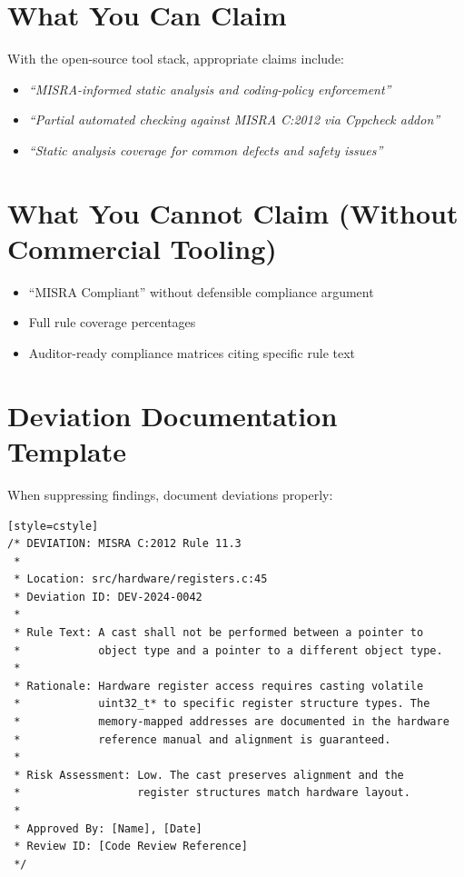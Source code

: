 \documentclass[11pt,letterpaper]{report}
\begin{document}
\section{What You Can Claim}

With the open-source tool stack, appropriate claims include:

\begin{itemize}[leftmargin=*]
    \item \textit{``MISRA-informed static analysis and coding-policy enforcement''}
    \item \textit{``Partial automated checking against MISRA C:2012 via Cppcheck addon''}
    \item \textit{``Static analysis coverage for common defects and safety issues''}
\end{itemize}

\section{What You Cannot Claim (Without Commercial Tooling)}

\begin{itemize}[leftmargin=*]
    \item ``MISRA Compliant'' without defensible compliance argument
    \item Full rule coverage percentages
    \item Auditor-ready compliance matrices citing specific rule text
\end{itemize}

\section{Deviation Documentation Template}

When suppressing findings, document deviations properly:

\begin{verbatim}[style=cstyle]
/* DEVIATION: MISRA C:2012 Rule 11.3
 *
 * Location: src/hardware/registers.c:45
 * Deviation ID: DEV-2024-0042
 *
 * Rule Text: A cast shall not be performed between a pointer to
 *            object type and a pointer to a different object type.
 *
 * Rationale: Hardware register access requires casting volatile
 *            uint32_t* to specific register structure types. The
 *            memory-mapped addresses are documented in the hardware
 *            reference manual and alignment is guaranteed.
 *
 * Risk Assessment: Low. The cast preserves alignment and the
 *                  register structures match hardware layout.
 *
 * Approved By: [Name], [Date]
 * Review ID: [Code Review Reference]
 */
\end{verbatim}
\end{document}
